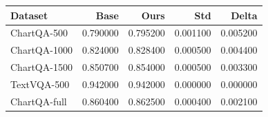 \begin{tabular}{lrrrr}
\toprule
Dataset & Base & Ours & Std & Delta \\
\midrule
ChartQA-500 & 0.790000 & 0.795200 & 0.001100 & 0.005200 \\
ChartQA-1000 & 0.824000 & 0.828400 & 0.000500 & 0.004400 \\
ChartQA-1500 & 0.850700 & 0.854000 & 0.000500 & 0.003300 \\
TextVQA-500 & 0.942000 & 0.942000 & 0.000000 & 0.000000 \\
ChartQA-full & 0.860400 & 0.862500 & 0.000400 & 0.002100 \\
\bottomrule
\end{tabular}
